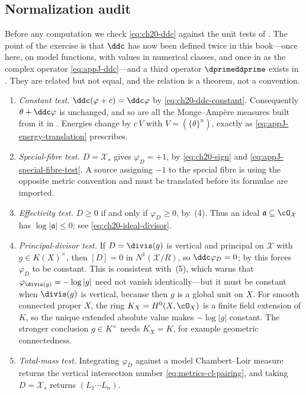 \subsection{Normalization audit}
\label{sec:ch20-normalization-audit}

Before any computation we check \eqref{eq:ch20-ddc} against the unit tests
of .  The point of the exercise is that
$\ddc$ has now been defined twice in this book---once here, on model
functions, with values in numerical classes, and once in
 as the complex operator
\eqref{eq:appJ-ddc}---and a third operator $\dprimeddprime$ exists in
.  They are related but not equal, and the relation is a
theorem, not a convention.

\begin{enumerate}
\item \emph{Constant test.}  $\ddc(\varphi+c)=\ddc\varphi$ by
 \eqref{eq:ch20-ddc-constant}.  Consequently
 $\theta+\ddc\varphi$ is unchanged, and so are all the Monge--Amp\`ere
 measures built from it in .  Energies change by
 $c\,V$ with $V=(\{\theta\}^n)$, exactly as
 \eqref{eq:appJ-energy-translation} prescribes.
\item \emph{Special-fibre test.}  $D=\mathcal X_s$ gives
 $\varphi_D=+1$, by \eqref{eq:ch20-sign} and
 \eqref{eq:appJ-special-fibre-test}.  A source assigning $-1$ to the
 special fibre is using the opposite metric convention and must be
 translated before its formulae are imported.
\item \emph{Effectivity test.}  $D\geq0$ if and only if
 $\varphi_D\geq0$, by
 \,(4).  Thus an ideal
 $\mathfrak a\subseteq\cO_{\mathcal X}$ has
 $\log|\mathfrak a|\leq0$; see \eqref{eq:ch20-ideal-divisor}.
\item \emph{Principal-divisor test.}  If $D=\divis(g)$ is vertical and principal on
 $\mathcal X$ with $g\in K(X)^\times$, then $[D]=0$ in
 $N^1(\mathcal X/R)$, so $\ddc\varphi_D=0$; by
  this forces $\varphi_D$ to be constant.  This
 is consistent with \,(5), which
 warns that $\varphi_{\divis(g)}=-\log|g|$ need not vanish
 identically---but it must be constant when $\divis(g)$ is vertical,
 because then $g$ is a global unit on $X$.  For smooth connected proper
 $X$, the ring $K_X=H^0(X,\cO_X)$ is a finite field extension of $K$,
 so the unique extended absolute value makes $-\log|g|$ constant.
 The stronger conclusion $g\in K^\times$ needs $K_X=K$, for example
 geometric connectedness.
\item \emph{Total-mass test.}  Integrating $\varphi_D$ against a model
 Chambert--Loir measure returns the vertical intersection number
 \eqref{eq:metrics-cl-pairing}, and taking $D=\mathcal X_s$ returns
 $(L_1\cdots L_n)$.
\end{enumerate}

